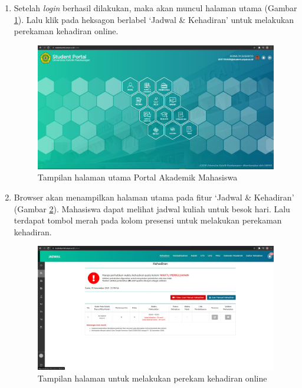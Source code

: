 \begin{enumerate}
	\item Setelah \textit{login} berhasil dilakukan, maka akan muncul halaman utama (Gambar \ref{fig:pam_home}). Lalu klik pada heksagon berlabel `Jadwal \& Kehadiran' untuk melakukan perekaman kehadiran online.
	\begin{figure}[H]
		\centering
		\includegraphics[scale=0.3]{Gambar/jadwalkehadiran.jpg}
		\caption{Tampilan halaman utama Portal Akademik Mahasiswa} 
		\label{fig:pam_home}
	\end{figure}

	\vspace{5cm}
	\item Browser akan menampilkan halaman utama pada fitur `Jadwal \& Kehadiran' (Gambar \ref{fig:pam_kehadiran}). Mahasiswa dapat melihat jadwal kuliah untuk besok hari. Lalu terdapat tombol merah pada kolom presensi untuk melakukan perekaman kehadiran.
	\begin{figure}[H]
		\centering
		\includegraphics[scale=0.3]{Gambar/kehadiran.jpg}
		\caption{Tampilan halaman untuk melakukan perekam kehadiran online} 
		\label{fig:pam_kehadiran}
	\end{figure}
\end{enumerate}

